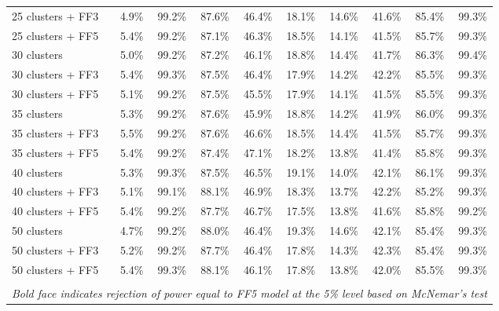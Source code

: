 \begin{table}[!h]
\begin{center}
\begin{tabular}{lrrrrrrrrr}
25 clusters + FF3	& 4.9\% & 99.2\% & 87.6\% & 46.4\% & 18.1\% & 14.6\% & 41.6\% & 85.4\% & 99.3\% \\
25 clusters + FF5	& 5.4\% & 99.2\% & 87.1\% & 46.3\% & 18.5\% & 14.1\% & 41.5\% & 85.7\% & 99.3\% \\
30 clusters	& 5.0\% & 99.2\% & 87.2\% & 46.1\% & 18.8\% & 14.4\% & 41.7\% & 86.3\% & 99.4\% \\
30 clusters + FF3	& 5.4\% & 99.3\% & 87.5\% & 46.4\% & 17.9\% & 14.2\% & 42.2\% & 85.5\% & 99.3\% \\
30 clusters + FF5	& 5.1\% & 99.2\% & 87.5\% & 45.5\% & 17.9\% & 14.1\% & 41.5\% & 85.5\% & 99.3\% \\
35 clusters	& 5.3\% & 99.2\% & 87.6\% & 45.9\% & 18.8\% & 14.2\% & 41.9\% & 86.0\% & 99.3\% \\
35 clusters + FF3	& 5.5\% & 99.2\% & 87.6\% & 46.6\% & 18.5\% & 14.4\% & 41.5\% & 85.7\% & 99.3\% \\
35 clusters + FF5	& 5.4\% & 99.2\% & 87.4\% & 47.1\% & 18.2\% & 13.8\% & 41.4\% & 85.8\% & 99.3\% \\
40 clusters	& 5.3\% & 99.3\% & 87.5\% & 46.5\% & 19.1\% & 14.0\% & 42.1\% & 86.1\% & 99.3\% \\
40 clusters + FF3	& 5.1\% & 99.1\% & 88.1\% & 46.9\% & 18.3\% & 13.7\% & 42.2\% & 85.2\% & 99.3\% \\
40 clusters + FF5	& 5.4\% & 99.2\% & 87.7\% & 46.7\% & 17.5\% & 13.8\% & 41.6\% & 85.8\% & 99.2\% \\
50 clusters	& 4.7\% & 99.2\% & 88.0\% & 46.4\% & 19.3\% & 14.6\% & 42.1\% & 85.4\% & 99.3\% \\
50 clusters + FF3	& 5.2\% & 99.2\% & 87.7\% & 46.4\% & 17.8\% & 14.3\% & 42.3\% & 85.4\% & 99.3\% \\
50 clusters + FF5	& 5.4\% & 99.3\% & 88.1\% & 46.1\% & 17.8\% & 13.8\% & 42.0\% & 85.5\% & 99.3\% \\
\hline\\
\multicolumn{10}{l}{\itshape Bold face indicates rejection of power equal to FF5 model at the 5\% level based on McNemar's test}
    \end{tabular}
    \end{center}
\end{table}
